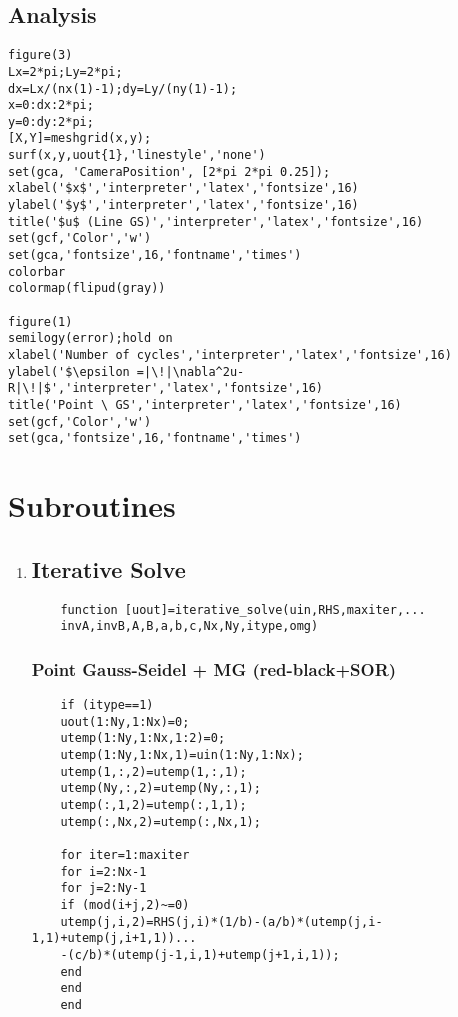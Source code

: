 \documentclass[11pt]{report}
\begin{document}
\begin{appendices}
\subsection*{Analysis}

\begin{verbatim}
figure(3)
Lx=2*pi;Ly=2*pi;
dx=Lx/(nx(1)-1);dy=Ly/(ny(1)-1);
x=0:dx:2*pi;
y=0:dy:2*pi;
[X,Y]=meshgrid(x,y);
surf(x,y,uout{1},'linestyle','none')
set(gca, 'CameraPosition', [2*pi 2*pi 0.25]);
xlabel('$x$','interpreter','latex','fontsize',16)
ylabel('$y$','interpreter','latex','fontsize',16)
title('$u$ (Line GS)','interpreter','latex','fontsize',16)
set(gcf,'Color','w')
set(gca,'fontsize',16,'fontname','times')
colorbar
colormap(flipud(gray))

figure(1)
semilogy(error);hold on
xlabel('Number of cycles','interpreter','latex','fontsize',16)
ylabel('$\epsilon =|\!|\nabla^2u-R|\!|$','interpreter','latex','fontsize',16)
title('Point \ GS','interpreter','latex','fontsize',16)
set(gcf,'Color','w')
set(gca,'fontsize',16,'fontname','times')
\end{verbatim}

\section*{Subroutines}
\begin{enumerate}
	\item
	\subsection*{Iterative Solve}
	\begin{verbatim}
	function [uout]=iterative_solve(uin,RHS,maxiter,...
	invA,invB,A,B,a,b,c,Nx,Ny,itype,omg)
	\end{verbatim}
	
	
	\subsubsection*{Point Gauss-Seidel + MG (red-black+SOR)}
	
	\begin{verbatim}
	if (itype==1)
	uout(1:Ny,1:Nx)=0;
	utemp(1:Ny,1:Nx,1:2)=0;
	utemp(1:Ny,1:Nx,1)=uin(1:Ny,1:Nx);
	utemp(1,:,2)=utemp(1,:,1);
	utemp(Ny,:,2)=utemp(Ny,:,1);
	utemp(:,1,2)=utemp(:,1,1);
	utemp(:,Nx,2)=utemp(:,Nx,1);
	
	for iter=1:maxiter
	for i=2:Nx-1
	for j=2:Ny-1
	if (mod(i+j,2)~=0)
	utemp(j,i,2)=RHS(j,i)*(1/b)-(a/b)*(utemp(j,i-1,1)+utemp(j,i+1,1))...
	-(c/b)*(utemp(j-1,i,1)+utemp(j+1,i,1));
	end
	end
	end
	

\end{verbatim}
\end{enumerate}
\end{appendices}
\end{document}
